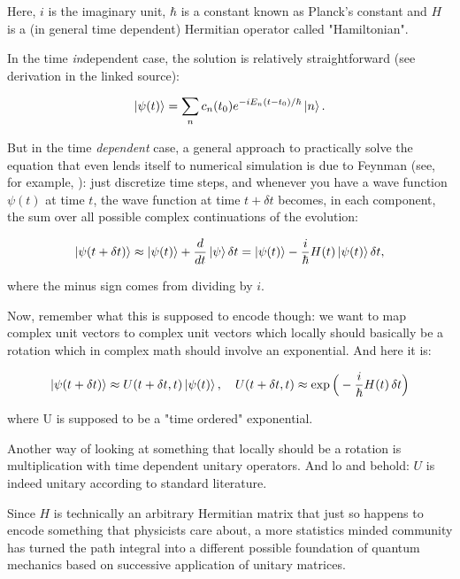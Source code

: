 \documentclass{article}
\begin{document}
Here, $i$ is the imaginary unit, $\hbar$ is a constant known as Planck's constant and $H$ is a (in general time dependent) Hermitian operator called "Hamiltonian".

In the time \textit{in}dependent case, the solution is relatively straightforward (see derivation in the linked source):

\begin{align*}
\ket{\psi(t)}=\sum_n c_n(t_0)e^{-iE_n(t-t_0)/\hbar}\ket{n}.
\end{align*}

But in the time \textit{dependent} case, a general approach to practically solve the equation that even lends itself to numerical simulation is due to Feynman (see, for example, \cite{Perepelitsa_PathIntegrals}): just discretize time steps, and whenever you have a wave function $\psi(t)$ at time $t$, the wave function at time $t+\delta t$ becomes, in each component, the sum over all possible complex continuations of the evolution:

\begin{align*}
\ket{\psi(t+\delta t)}\approx \ket{\psi(t)}+\frac{d}{dt}\ket{\psi}\delta t=\ket{\psi(t)}-\frac{i}{\hbar}H(t)\ket{\psi(t)}\delta t,
\end{align*}

where the minus sign comes from dividing by $i$.

Now, remember what this is supposed to encode though: we want to map complex unit vectors to complex unit vectors which locally should basically be a rotation which in complex math should involve an exponential. And here it is:

\begin{align*}
\ket{\psi(t+\delta t)} \approx U(t+\delta t, t) \ket{\psi(t)}, \quad
U(t+\delta t, t) \approx \exp\Big(-\frac{i}{\hbar} H(t)\, \delta t \Big)
\end{align*}

where U is supposed to be a "time ordered" exponential.

Another way of looking at something that locally should be a rotation is multiplication with time dependent unitary operators. And lo and behold: $U$ is indeed unitary according to standard literature.

Since $H$ is technically an arbitrary Hermitian matrix that just so happens to encode something that physicists care about, a more statistics minded community has turned the path integral into a different possible foundation \cite{Luty2007PathIntegrals} of quantum mechanics based on successive application of unitary matrices.
\end{document}

